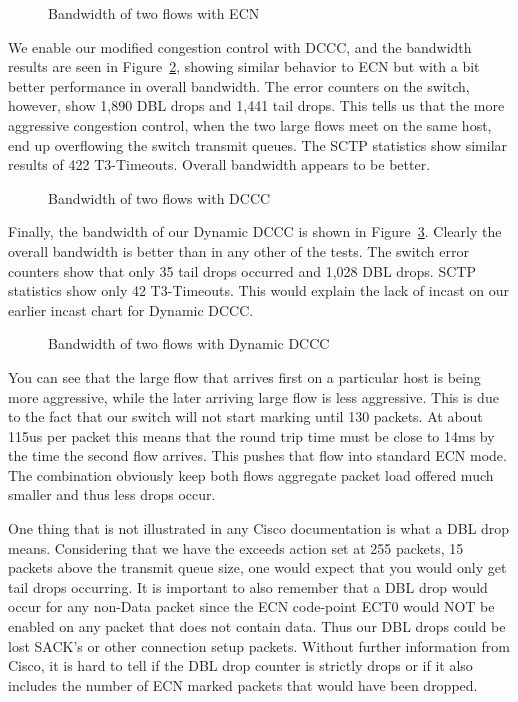 \documentclass[12pt]{article}
\begin{document}
\begin{figure}[h]
\centering
{}
\caption{Bandwidth of two flows with ECN}
\label{fig:ecnBw}
\end{figure}


\newpage

We enable our modified congestion control with DCCC, and the bandwidth
results are seen in Figure~\ref{fig:dcccBw}, showing similar behavior to ECN but with a bit better performance in
overall bandwidth. The error counters on the switch, however,
show 1,890 DBL drops and 1,441 tail drops. This tells us that  the more aggressive congestion
control, when the two large flows meet on the same host, end up overflowing the switch
transmit queues. The SCTP statistics show similar results of 422 T3-Timeouts. Overall bandwidth
appears to be better.


\begin{figure}[h]
\centering
{}
\caption{Bandwidth of two flows with DCCC}
\label{fig:dcccBw}
\end{figure}


\newpage

Finally, the bandwidth of our Dynamic DCCC is shown in Figure~\ref{fig:dynBw}. Clearly the
overall bandwidth is better than in any other of the tests. The switch error counters show that only 35 tail
drops occurred and 1,028 DBL drops. SCTP statistics show only 42 T3-Timeouts. This would explain
the lack of incast on our earlier incast chart for Dynamic DCCC.

\begin{figure}[h]
\centering
{}
\caption{Bandwidth of two flows with Dynamic DCCC}
\label{fig:dynBw}
\end{figure}


You can see that the large flow that arrives first on a particular
host is being more aggressive, while the later arriving large flow is less aggressive. This is due to
the fact that our switch will not start marking until 130 packets. At about 115us per packet this means
that the round trip time must be close to 14ms by the time the second flow arrives. This pushes that
flow into standard ECN mode. The combination obviously keep both flows aggregate packet load
offered much smaller and thus less drops occur.

One thing that is not illustrated in any Cisco documentation is what a DBL drop means. Considering
that we have the exceeds action set at 255 packets, 15 packets above the transmit queue size, one
would expect that you would only get tail drops occurring.  It is important to also remember that a DBL 
drop would occur for any non-Data packet since the ECN code-point ECT0 would NOT be enabled on any packet that
does not contain data. Thus our DBL drops could be lost SACK's or other connection setup packets.
Without further information from Cisco, it is hard to tell if the DBL drop counter is strictly drops or
if it also includes the number of ECN marked packets that would have been dropped.
\end{document}

